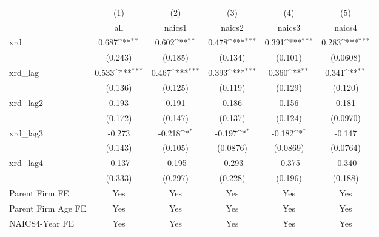 {
\def\sym#1{\ifmmode^{#1}\else\(^{#1}\)\fi}
\begin{tabular}{l*{5}{c}}
\hline\hline
            &\multicolumn{1}{c}{(1)}&\multicolumn{1}{c}{(2)}&\multicolumn{1}{c}{(3)}&\multicolumn{1}{c}{(4)}&\multicolumn{1}{c}{(5)}\\
            &\multicolumn{1}{c}{all}&\multicolumn{1}{c}{naics1}&\multicolumn{1}{c}{naics2}&\multicolumn{1}{c}{naics3}&\multicolumn{1}{c}{naics4}\\
\hline
xrd         &       0.687\sym{**} &       0.602\sym{**} &       0.478\sym{***}&       0.391\sym{***}&       0.283\sym{***}\\
            &     (0.243)         &     (0.185)         &     (0.134)         &     (0.101)         &    (0.0608)         \\
[1em]
xrd\_lag     &       0.533\sym{***}&       0.467\sym{***}&       0.393\sym{***}&       0.360\sym{**} &       0.341\sym{**} \\
            &     (0.136)         &     (0.125)         &     (0.119)         &     (0.129)         &     (0.120)         \\
[1em]
xrd\_lag2    &       0.193         &       0.191         &       0.186         &       0.156         &       0.181         \\
            &     (0.172)         &     (0.147)         &     (0.137)         &     (0.124)         &    (0.0970)         \\
[1em]
xrd\_lag3    &      -0.273         &      -0.218\sym{*}  &      -0.197\sym{*}  &      -0.182\sym{*}  &      -0.147         \\
            &     (0.143)         &     (0.105)         &    (0.0876)         &    (0.0869)         &    (0.0764)         \\
[1em]
xrd\_lag4    &      -0.137         &      -0.195         &      -0.293         &      -0.375         &      -0.340         \\
            &     (0.333)         &     (0.297)         &     (0.228)         &     (0.196)         &     (0.188)         \\
[1em]
Parent Firm FE&         Yes         &         Yes         &         Yes         &         Yes         &         Yes         \\
[1em]
Parent Firm Age FE&         Yes         &         Yes         &         Yes         &         Yes         &         Yes         \\
[1em]
NAICS4-Year FE&         Yes         &         Yes         &         Yes         &         Yes         &         Yes         \\

\end{tabular}}
